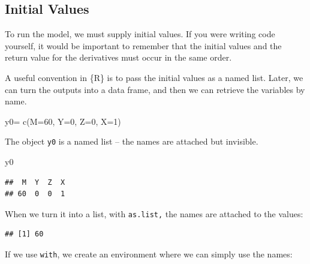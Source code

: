 \documentclass[
]{book}
\newenvironment{Shaded}{\begin{snugshade}}{\end{snugshade}}
\newcommand{\AttributeTok}[1]{\textcolor[rgb]{0.77,0.63,0.00}{#1}}
\newcommand{\DecValTok}[1]{\textcolor[rgb]{0.00,0.00,0.81}{#1}}
\newcommand{\FunctionTok}[1]{\textcolor[rgb]{0.00,0.00,0.00}{#1}}
\newcommand{\NormalTok}[1]{#1}
\newcommand{\OtherTok}[1]{\textcolor[rgb]{0.56,0.35,0.01}{#1}}
\newcommand{\SpecialCharTok}[1]{\textcolor[rgb]{0.00,0.00,0.00}{#1}}
\begin{document}
\hypertarget{initial-values}{%
\subsection{Initial Values}\label{initial-values}}

To run the model, we must supply initial values. If you were writing code yourself, it would be important to remember that the initial values and the return value for the derivatives must occur in the same order.

A useful convention in \{R\} is to pass the initial values as a named list. Later, we can turn the outputs into a data frame, and then we can retrieve the variables by name.

\begin{Shaded}
\begin{Highlighting}[]
\NormalTok{y0}\OtherTok{=} \FunctionTok{c}\NormalTok{(}\AttributeTok{M=}\DecValTok{60}\NormalTok{, }\AttributeTok{Y=}\DecValTok{0}\NormalTok{, }\AttributeTok{Z=}\DecValTok{0}\NormalTok{, }\AttributeTok{X=}\DecValTok{1}\NormalTok{)}
\end{Highlighting}
\end{Shaded}

The object \texttt{y0} is a named list -- the names are attached but invisible.

\begin{Shaded}
\begin{Highlighting}[]
\NormalTok{y0}
\end{Highlighting}
\end{Shaded}

\begin{verbatim}
##  M  Y  Z  X 
## 60  0  0  1
\end{verbatim}

When we turn it into a list, with \texttt{as.list,} the names are attached to the values:

\begin{Shaded}
\end{Shaded}

\begin{verbatim}
## [1] 60
\end{verbatim}

If we use \texttt{with}, we create an environment where we can simply use the names:
\end{document}
